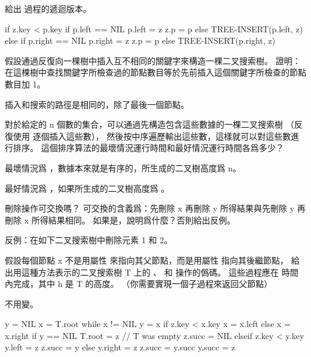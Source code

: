 \startsection[
  title={Insertion and deletion},
]

\startEXERCISE
給出  過程的遞迴版本。
\stopEXERCISE

\startANSWER
{}
\startCLRS
if z.key < p.key
	if p.left == NIL
		p.left = z
		z.p = p
	else TREE-INSERT(p.left, z)
else
	if p.right == NIL
		p.right = z
		z.p = p
	else TREE-INSERT(p.right, z)
\stopCLRS
\stopANSWER

\startEXERCISE
假設通過反復向一棵樹中插入互不相同的關鍵字來構造一棵二叉搜索樹。
證明：在這棵樹中查找關鍵字所檢查過的節點數目等於先前插入這個關鍵字所檢查的節點數目加 1。
\stopEXERCISE

\startANSWER
插入和搜索的路徑是相同的，除了最後一個節點。
\stopANSWER

\startEXERCISE
對於給定的 n 個數的集合，可以通過先構造包含這些數據的一棵二叉搜索樹
（反復使用  逐個插入這些數），
然後按中序遍歷輸出這些數，這樣就可以對這些數進行排序。
這個排序算法的最壞情況運行時間和最好情況運行時間各爲多少？
\stopEXERCISE

\startANSWER
最壞情況爲 ，數據本來就是有序的，所生成的二叉樹高度爲 n。

最好情況爲 ，如果所生成的二叉樹高度爲 。
\stopANSWER

\startEXERCISE
刪除操作可交換嗎？
可交換的含義爲：先刪除 x 再刪除 y 所得結果與先刪除 y 再刪除 x 所得結果相同。
如果是，說明爲什麼？否則給出反例。
\stopEXERCISE

\startANSWER
反例：在如下二叉搜索樹中刪除元素 1 和 2。
\externalfigure[output/e12_3_4-1]
\stopANSWER

\startEXERCISE
假設每個節點 x 不是用屬性  來指向其父節點，而是用屬性  指向其後繼節點，
給出用這種方法表示的二叉搜索樹 T 上的 、  和  操作的僞碼。
這些過程應在  時間內完成，其中 h 是 T 的高度。
（\hint 你需要實現一個子過程來返回父節點）
\stopEXERCISE

\startANSWER
{}

 不用變。

\startCLRS
y = NIL
x = T.root
while x != NIL
	y = x
	if z.key < x.key
		x = x.left
	else
		x = x.right
if y == NIL
	T.root = z	// T was empty
	z.succ = NIL
elseif z.key < y.key
	y.left = z
	z.succ = y
else
	y.right = z
	z.succ = y.succ
	y.succ = z
\stopCLRS

